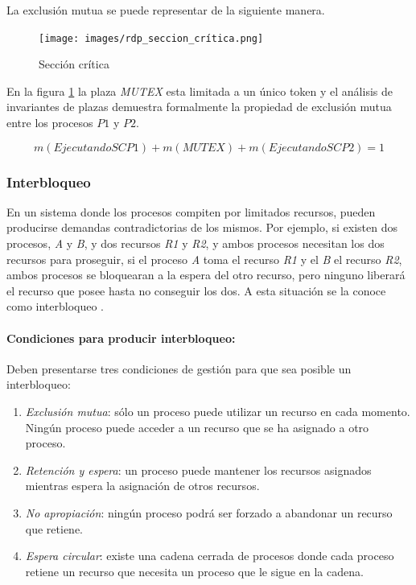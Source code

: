 \noindent La exclusión mutua se puede representar de la siguiente manera.
\begin{figure}[H]
    \centering
    \texttt{[image: images/rdp\_seccion\_crítica.png]}
    \caption{Sección crítica}
    \label{fig:rdp_seccion_crítica}
  \end{figure}

En la figura \ref{fig:rdp_seccion_crítica} la plaza \textit{MUTEX} esta limitada a un único token y el análisis de invariantes de plazas demuestra formalmente la propiedad de exclusión mutua entre los procesos $P1$ y $P2$. 

\begin{equation}
    m(EjecutandoSCP1) + m(MUTEX) + m(EjecutandoSCP2) = 1
\end{equation}

\subsubsection{Interbloqueo}
En un sistema donde los procesos compiten por limitados recursos, pueden producirse demandas contradictorias de los mismos. Por ejemplo, si existen dos procesos, \textit{A} y \textit{B}, y dos recursos \textit{R1} y \textit{R2}, y ambos procesos necesitan los dos recursos para proseguir, si el proceso \textit{A} toma el recurso \textit{R1} y el \textit{B} el recurso \textit{R2}, ambos procesos se bloquearan a la espera del otro recurso, pero ninguno liberará el recurso que posee hasta no conseguir los dos. A esta situación se la conoce como interbloqueo \cite{stallings}. 

\paragraph{Condiciones para producir interbloqueo: }
\noindent Deben presentarse tres condiciones de gestión para que sea posible un interbloqueo:
\begin{enumerate}
    \item \textit{Exclusión mutua}: sólo un proceso puede utilizar un recurso en cada momento. Ningún proceso puede acceder a un recurso que se ha asignado a otro proceso.
    
    \item \textit{Retención y espera}: un proceso puede mantener los recursos asignados mientras espera la asignación de otros recursos.
    
    \item \textit{No apropiación}: ningún proceso podrá ser forzado a abandonar un recurso que retiene.
    
    \item \textit{Espera circular}: existe una cadena cerrada de procesos donde cada proceso retiene un recurso que necesita un proceso que le sigue en la cadena.
\end{enumerate}


